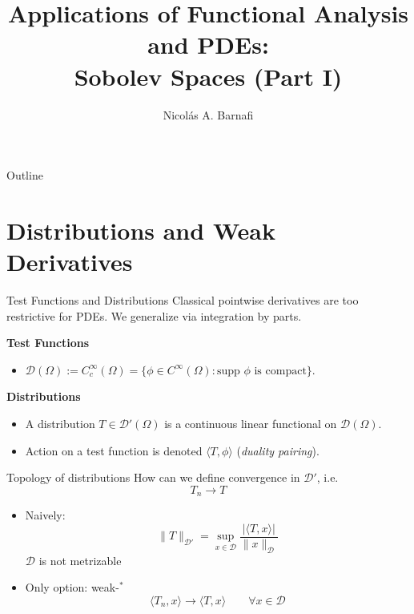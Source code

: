 \documentclass[aspectratio=169]{beamer}
\title[Sobolev Spaces]{Applications of Functional Analysis and PDEs: \\ Sobolev Spaces (Part I)}
\author{Nicol\'as A. Barnafi}
\date{}
\begin{document}
\begin{frame}
    \titlepage
\end{frame}

\begin{frame}{Outline}
    \tableofcontents
\end{frame}

\section{Distributions and Weak Derivatives}

\begin{frame}{Test Functions and Distributions}
    Classical pointwise derivatives are too restrictive for PDEs. We generalize via integration by parts.
    
    \vspace{0.3cm}
    \textbf{Test Functions}
    \begin{itemize}
        \item $\mathcal{D}(\Omega) := C^\infty_c(\Omega) = \{ \phi \in C^\infty(\Omega) : \text{supp } \phi \text{ is compact} \}$.
    \end{itemize}

    \vspace{0.3cm}
    \textbf{Distributions}
    \begin{itemize}
        \item A distribution $T \in \mathcal{D}'(\Omega)$ is a continuous linear functional on $\mathcal{D}(\Omega)$.
        \item Action on a test function is denoted $\langle T, \phi \rangle$ (\emph{duality pairing}).
    \end{itemize}
\end{frame}

\begin{frame}[t]{Topology of distributions}
    How can we define convergence in $\mathcal D'$, i.e.
        $$ T_n \to T  $$
    \begin{itemize}
        \item Naively: 
    $$ \| T \|_{\mathcal D'} = \sup_{x \in \mathcal D} \frac{|\langle T, x\rangle|}{\| x \|_{\mathcal D}} $$    
            \pause \hfill \alert{$\mathcal D$ is not metrizable}
        \pause \item Only option: weak-$^*$
            $$ \langle T_n, x \rangle \to \langle T, x\rangle \qquad \forall x\in \mathcal D$$
    \end{itemize}

\end{frame}
\end{document}
